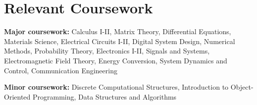 \documentclass[letterpaper,11pt]{article}
\makeatletter
\newcommand{\resumeOrganizationHeading}[4]{
  \vspace{-2pt}\item
    \begin{tabular*}{0.97\textwidth}[t]{l@{\extracolsep{\fill}}r}
      \textbf{#1} & \textit{\small #2} \\
      \textit{\small#3}
    \end{tabular*}\vspace{-7pt}
}
\newcommand{\resumeSubHeadingListStart}{\begin{itemize}[leftmargin=0.15in, label={}]}
\newcommand{\resumeSubHeadingListEnd}{\end{itemize}}
\makeatother
\begin{document}
\section{Relevant Coursework}
  \vspace{2pt}
  \resumeSubHeadingListStart
    \small{\item{
        \textbf{Major coursework:}{ Calculus I-II, Matrix Theory, Differential Equations, Materials Science, Electrical Circuits I-II, Digital System Design, Numerical Methods, Probability Theory, Electronics I-II, Signals and Systems, Electromagnetic Field Theory, Energy Conversion, System Dynamics and Control, Communication Engineering} \\ \vspace{3pt}
        
        \textbf{Minor coursework:}{ Discrete Computational Structures, Introduction to Object-Oriented Programming, Data Structures and Algorithms}
    }}
  \resumeSubHeadingListEnd




    
    




    
    








    



\end{document}
